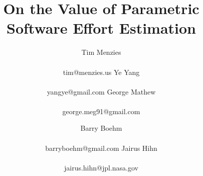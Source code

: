 \documentclass{sig-alternate}
\begin{document}
  
%


\title{On the Value of Parametric Software Effort Estimation}


%
%
%
%
%

%

\author{
%
%
\alignauthor
Tim Menzies\\
       \\
       {tim@menzies.us}
\alignauthor Ye Yang\\
       \\
       {yangye@gmail.com}
\alignauthor George Mathew \\
       \\
       {george.meg91@gmail.com}
\and
\alignauthor Barry Boehm\\
       \\
       {barryboehm@gmail.com}
\alignauthor Jairus Hihn\\
       \\
       {jairus.hihn@jpl.nasa.gov}  }
\end{document}
